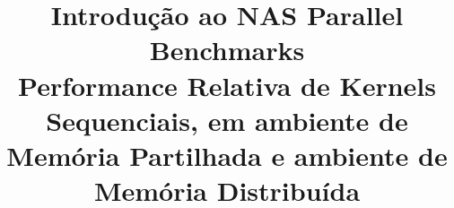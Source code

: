 \documentclass[conference,compsoc]{IEEEtran}
\begin{document}
%
\title{Introdução ao NAS Parallel Benchmarks\\ Performance Relativa de Kernels Sequenciais, em ambiente de Memória Partilhada e ambiente de Memória Distribuída}


\author{
}


% 




\end{document}
